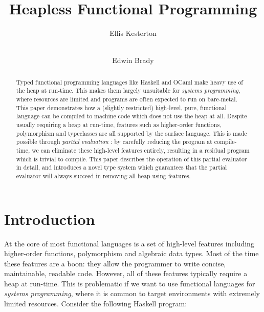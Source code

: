 \documentclass[runningheads]{llncs}
\begin{document}
%
\title{Heapless Functional Programming}
%
%
\author{Ellis Kesterton  \and \\
Edwin Brady }
%
%

\newcommand{\core}{$\mathcal{C}$}
\newcommand{\high}{$\mathcal{H}$}
\newcommand{\fom}{System $F_{\omega}$}
%
\maketitle              %
%
\begin{abstract}
Typed functional programming languages like Haskell and OCaml make heavy use of the heap at run-time. This makes them largely unsuitable for \emph{systems programming}, where resources are limited and programs are often expected to run on bare-metal. This paper demonstrates how a (slightly restricted) high-level, pure, functional language can be compiled to machine code which does not use the heap at all. Despite usually requiring a heap at run-time, features such as higher-order functions, polymorphism and typeclasses are all supported by the surface language. This is made possible through \emph{partial evaluation} \cite{jones1993partial}: by carefully reducing the program at compile-time, we can eliminate these high-level features entirely, resulting in a residual program which is trivial to compile. This paper describes the operation of this partial evaluator in detail, and introduces a novel type system which guarantees that the partial evaluator will always succeed in removing all heap-using features.

\end{abstract}
%
%
%
\section{Introduction}

At the core of most functional languages is a set of high-level features including higher-order functions, polymorphism and algebraic data types. Most of the time these features are a boon: they allow the programmer to write concise, maintainable, readable code. However, all of these features typically require a heap at run-time. This is problematic if we want to use functional languages for \emph{systems programming}, where it is common to target environments with extremely limited resources. Consider the following Haskell program:
\end{document}
